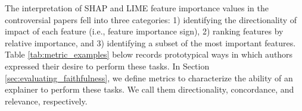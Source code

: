 \documentclass[12pt]{article}  %
\begin{document}
        The interpretation of SHAP and LIME feature importance values in the controversial papers fell into three categories: 1) identifying the directionality of impact of each feature (i.e., feature importance sign), 2) ranking features by relative importance, and 3) identifying a subset of the most important features. Table \ref{tab:metric_examples} below records prototypical ways in which authors expressed their desire to perform these tasks. In Section \ref{sec:evaluating_faithfulness}, we define metrics to characterize the ability of an explainer to perform these tasks. We call them directionality, concordance, and relevance, respectively. 

\end{document}
